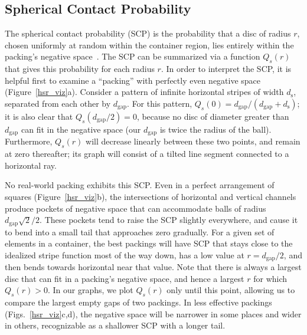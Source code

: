 \subsection{Spherical Contact Probability}

The spherical contact probability (SCP) is the probability that a 
disc of radius $r$, chosen
uniformly at random within the container region, lies entirely within the 
packing's negative space~\cite{Chiu2013}.
The SCP can be summarized via a function $Q_s(r)$ that gives this 
probability for each radius $r$.
In order to interpret the SCP, it is helpful first to
examine a ``packing'' with perfectly even negative space (Figure~\ref{hsr_viz}a).
Consider a pattern of infinite horizontal stripes of width $d_\mathrm{s}$,
separated from each other by $d_\mathrm{gap}$.  For this pattern,
$Q_s(0)=d_\mathrm{gap}/(d_\mathrm{gap}+d_\mathrm{s})$; it is also
clear that $Q_s(d_\mathrm{gap}/2)=0$, because no disc of diameter greater
than $d_\mathrm{gap}$ can fit in the negative space
(our $d_\mathrm{gap}$ is twice the radius of the ball).
Furthermore,
$Q_s(r)$ will decrease linearly between these two points, and remain
at zero thereafter; its graph will consist of a tilted line segment
connected to a horizontal ray.

No real-world packing exhibits this SCP.  Even in a perfect arrangement
of squares (Figure~\ref{hsr_viz}b), the intersections of horizontal and
vertical channels
produce pockets of negative space that can accommodate balls of
radius $d_\mathrm{gap}\sqrt{2}/2$.  These pockets tend to raise the SCP
slightly everywhere, and cause it to bend into a small tail that
approaches zero gradually.
For a given set of elements in a container, the best packings will
have  SCP that stays close to the idealized stripe function most
of the way down, has a low value at $r=d_\mathrm{gap}/2$,
and then bends towards horizontal near that value.
Note that there is always a largest disc that can fit in a packing's
negative space, and hence a largest $r$ for which $Q_s(r)>0$.  
In our graphs, we plot $Q_s(r)$ only until this point, allowing us
to compare the largest empty gaps of two packings.
In less effective packings (Figs.~\ref{hsr_viz}c,d), the negative space 
will be narrower in
some places and wider in others, recognizable as a shallower SCP
with a longer tail.

